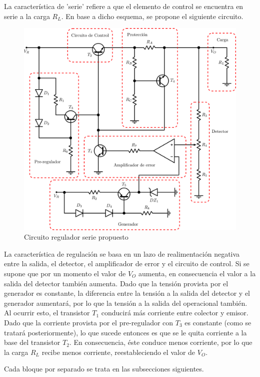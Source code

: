 La caracter\'istica de 'serie' refiere a que el elemento de control se encuentra en serie a la carga $R_L$. En base a dicho esquema, se propone el siguiente circuito.

\begin{figure}[!ht]
\begin{centering}
\includegraphics[scale=0.32]{Imagenes/CircuitoSinCap.png}
\par\end{centering}
\caption{Circuito regulador serie propuesto}

\end{figure}

La caracter\'istica de regulaci\'on se basa en un lazo de realimentaci\'on negativa entre la salida, el detector, el amplificador de error y el circuito de control. Si se supone que por un momento el valor de $V_O$ aumenta, en consecuencia el valor a la salida del detector tambi\'en aumenta. Dado que la tensi\'on provista por el generador es constante, la diferencia entre la tensi\'on a la salida del detector y el generador aumentar\'a, por lo que la tensi\'on a la salida del operacional tambi\'en. Al ocurrir esto, el transistor $T_1$ conducir\'a m\'as corriente entre colector y emisor. Dado que la corriente provista por el pre-regulador con $T_3$ es constante (como se tratar\'a posteriormente), lo que sucede entonces es que se le quita corriente a la base del transistor $T_2$. En consecuencia, \'este conduce menos corriente, por lo que la carga $R_L$ recibe menos corriente, reestableciendo el valor de $V_O$.\par
Cada bloque por separado se trata en las subsecciones siguientes.

